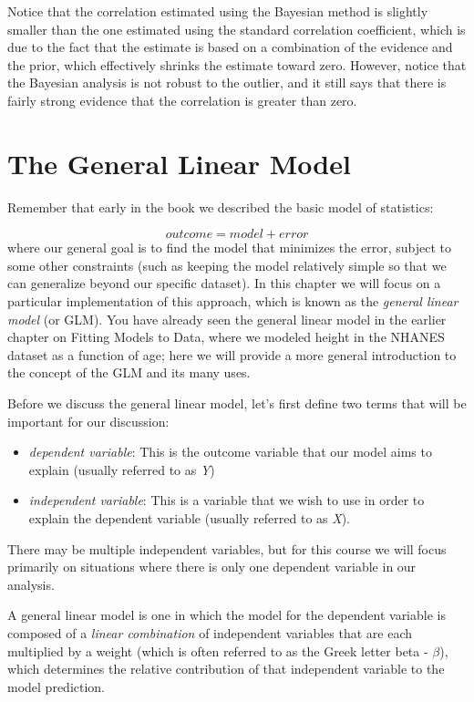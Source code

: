\documentclass[12pt,]{book}
\providecommand{\tightlist}{%
  \setlength{\itemsep}{0pt}\setlength{\parskip}{0pt}}
\theoremstyle{definition}
\theoremstyle{definition}
\theoremstyle{definition}
\theoremstyle{remark}
\begin{document}
Notice that the correlation estimated using the Bayesian method is slightly smaller than the one estimated using the standard correlation coefficient, which is due to the fact that the estimate is based on a combination of the evidence and the prior, which effectively shrinks the estimate toward zero. However, notice that the Bayesian analysis is not robust to the outlier, and it still says that there is fairly strong evidence that the correlation is greater than zero.

\hypertarget{the-general-linear-model}{%
\chapter{The General Linear Model}\label{the-general-linear-model}}

Remember that early in the book we described the basic model of statistics:

\[
outcome = model + error
\]
where our general goal is to find the model that minimizes the error, subject to some other constraints (such as keeping the model relatively simple so that we can generalize beyond our specific dataset). In this chapter we will focus on a particular implementation of this approach, which is known as the \emph{general linear model} (or GLM). You have already seen the general linear model in the earlier chapter on Fitting Models to Data, where we modeled height in the NHANES dataset as a function of age; here we will provide a more general introduction to the concept of the GLM and its many uses.

Before we discuss the general linear model, let's first define two terms that will be important for our discussion:

\begin{itemize}
\tightlist
\item
  \emph{dependent variable}: This is the outcome variable that our model aims to explain (usually referred to as \emph{Y})
\item
  \emph{independent variable}: This is a variable that we wish to use in order to explain the dependent variable (usually referred to as \emph{X}).
\end{itemize}

There may be multiple independent variables, but for this course we will focus primarily on situations where there is only one dependent variable in our analysis.

A general linear model is one in which the model for the dependent variable is composed of a \emph{linear combination} of independent variables that are each multiplied by a weight (which is often referred to as the Greek letter beta - \(\beta\)), which determines the relative contribution of that independent variable to the model prediction.
\end{document}
